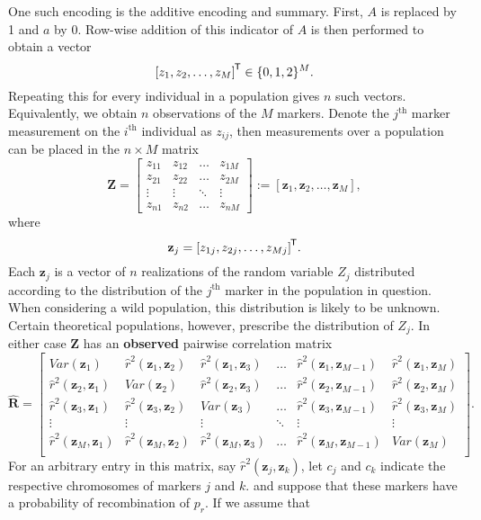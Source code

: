 \documentclass{article}
\newcommand{\ve}[1]{\mathbf{#1}}           %
\newcommand{\m}[1]{\mathbf{#1}}               %
\newcommand{\tr}[1]{{#1}^{\mkern-1.5mu\mathsf{T}}}              %
\newcommand{\obscorr}{\widehat{r}^2}
\begin{document}
One such encoding is the additive encoding and summary. First, $A$ is replaced by 1 and $a$ by 0. Row-wise addition of this indicator of $A$ is then performed to obtain a vector
$$\tr{[z_1, z_2, \dots, z_M]} \in \{0,1,2\}^M.$$
Repeating this for every individual in a population gives $n$ such vectors. Equivalently, we obtain $n$ observations of the $M$ markers. Denote the $j^{\text{th}}$ marker measurement on the $i^{\text{th}}$ individual as $z_{ij}$, then measurements over a population can be placed in the $n \times M$ matrix
$$\m{Z} = \begin{bmatrix}
  z_{11} & z_{12} & \dots & z_{1M} \\
  z_{21} & z_{22} & \dots & z_{2M} \\
  \vdots & \vdots & \ddots & \vdots \\
  z_{n1} & z_{n2} & \dots & z_{nM}
\end{bmatrix} := [\ve{z}_1, \ve{z}_2, \dots, \ve{z}_M],$$
where
$$\ve{z}_j = \tr{[z_{1j}, z_{2j}, \dots, z_{Mj}]}.$$
Each $\ve{z}_j$ is a vector of $n$ realizations of the random variable $Z_j$ distributed according to the distribution of the $j^{\text{th}}$ marker in the population in question. When considering a wild population, this distribution is likely to be unknown. Certain theoretical populations, however, prescribe the distribution of $Z_j$. In either case $\m{Z}$ has an \textbf{observed} pairwise correlation matrix
$$\widehat{\m{R}} = \begin{bmatrix}
  Var(\ve{z}_1) & \obscorr(\ve{z}_1, \ve{z}_2) & \obscorr(\ve{z}_1, \ve{z}_3) & \dots & \obscorr(\ve{z}_1, \ve{z}_{M-1}) & \obscorr(\ve{z}_1, \ve{z}_M) \\
  \obscorr(\ve{z}_2, \ve{z}_1) & Var(\ve{z}_2) & \obscorr(\ve{z}_2, \ve{z}_3) & \dots & \obscorr(\ve{z}_2, \ve{z}_{M-1}) & \obscorr(\ve{z}_2, \ve{z}_M) \\
  \obscorr(\ve{z}_3, \ve{z}_1) & \obscorr(\ve{z}_3, \ve{z}_2) & Var(\ve{z}_3) & \dots & \obscorr(\ve{z}_3, \ve{z}_{M-1}) & \obscorr(\ve{z}_3, \ve{z}_M) \\
  \vdots & \vdots & \vdots & \ddots & \vdots & \vdots \\
  \obscorr(\ve{z}_M, \ve{z}_1) & \obscorr(\ve{z}_M, \ve{z}_2) & \obscorr(\ve{z}_M, \ve{z}_3) & \dots & \obscorr(\ve{z}_M, \ve{z}_{M-1}) & Var(\ve{z}_M) \\
\end{bmatrix}.$$
For an arbitrary entry in this matrix, say $\obscorr(\ve{z}_j, \ve{z}_k)$, let $c_j$ and $c_k$ indicate the respective chromosomes of markers $j$ and $k$. and suppose that these markers have a probability of recombination of $p_r$. If we assume that
\end{document}
